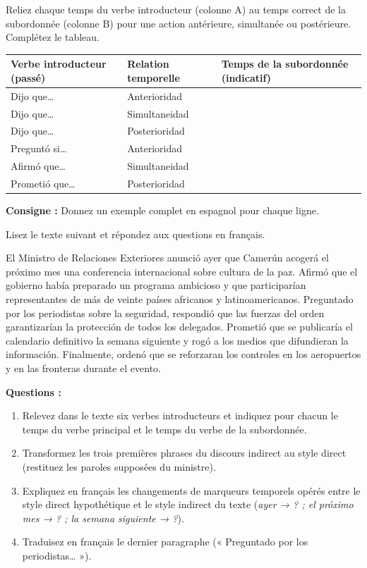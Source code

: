 \documentclass[11pt]{article}
\newcounter{popsec}
\newcounter{popsub}
\newcommand{\courssub}[1]{%
  \stepcounter{popsub}%
  \par\vspace{9pt}\noindent{\popxbold\fontsize{11.5}{13}\selectfont\color{popink}{\color{poporange}\thepopsec.\thepopsub}\hspace{6pt}#1}\par\nopagebreak\vspace{4pt}
}
\begin{document}
\begin{exercice}
Reliez chaque temps du verbe introducteur (colonne A) au temps correct de la subordonnée (colonne B) pour une action antérieure, simultanée ou postérieure. Complétez le tableau.
\begin{center}
\begin{tabularx}{\linewidth}{|X|X|X|}
\hline
\rowcolor{popblueL}
Verbe introducteur (passé) & Relation temporelle & Temps de la subordonnée (indicatif) \\
\hline
Dijo que… & Anterioridad & \\
\hline
Dijo que… & Simultaneidad & \\
\hline
Dijo que… & Posterioridad & \\
\hline
Preguntó si… & Anterioridad & \\
\hline
Afirmó que… & Simultaneidad & \\
\hline
Prometió que… & Posterioridad & \\
\hline
\end{tabularx}
\end{center}
\textbf{Consigne :} Donnez un exemple complet en espagnol pour chaque ligne.
\end{exercice}

\courssub{Je me prépare au Bac}

\begin{exercice}
Lisez le texte suivant et répondez aux questions en français.
\begin{textebox}
El Ministro de Relaciones Exteriores anunció ayer que Camerún acogerá el próximo mes una conferencia internacional sobre cultura de la paz. Afirmó que el gobierno había preparado un programa ambicioso y que participarían representantes de más de veinte países africanos y latinoamericanos. Preguntado por los periodistas sobre la seguridad, respondió que las fuerzas del orden garantizarían la protección de todos los delegados. Prometió que se publicaría el calendario definitivo la semana siguiente y rogó a los medios que difundieran la información. Finalmente, ordenó que se reforzaran los controles en los aeropuertos y en las fronteras durante el evento.
\end{textebox}
\textbf{Questions :}
\begin{enumerate}
\item Relevez dans le texte six verbes introducteurs et indiquez pour chacun le temps du verbe principal et le temps du verbe de la subordonnée.
\item Transformez les trois premières phrases du discours indirect au style direct (restituez les paroles supposées du ministre).
\item Expliquez en français les changements de marqueurs temporels opérés entre le style direct hypothétique et le style indirect du texte (\emph{ayer → ? ; el próximo mes → ? ; la semana siguiente → ?}).
\item Traduisez en français le dernier paragraphe (« Preguntado por los periodistas… »).
\end{enumerate}
\end{exercice}
\end{document}

